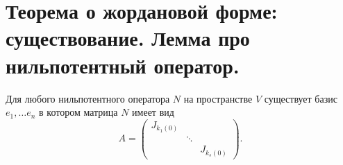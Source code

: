 \section{Теорема о жордановой форме: существование. Лемма про нильпотентный оператор.}
\begin{thm}
    Для  любого нильпотентного оператора $ N$ на пространстве   $ V$ существует базис $ e_1, \ldots e_n$ в котором матрица $ N$ имеет вид
    \[
    A = 
    \begin{pmatrix}
	J_{k_1(0)} & & \\
		   & \ddots & \\
		   & & J_{k_s(0)}
    \end{pmatrix}
    .\] 
\end{thm}
